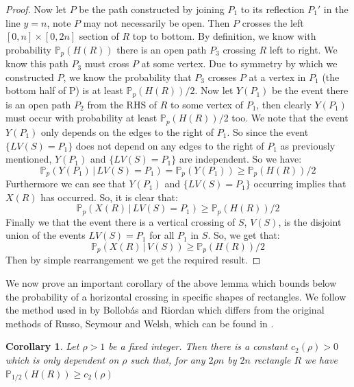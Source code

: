 \documentclass[a4paper,11pt]{article}
\newtheorem{corollary}[theorem]{Corollary}
\theoremstyle{definition}
\newcommand{\prob}{\mathbb{P}_p}
\begin{document}
\begin{proof}
	Now let $P$ be the path constructed by joining $P_1$ to its reflection $P_1'$ in the line $y=n$, note $P$ may not necessarily be open. Then $P$ crosses the left $[0,n] \times [0,2n]$ section of $R$ top to bottom. By definition, we know with probability $\prob(H(R))$ there is an open path $P_3$ crossing $R$ left to right. We know this path $P_3$ must cross $P$ at some vertex. Due to symmetry by which we constructed $P$, we know the probability that $P_3$ crosses $P$ at a vertex in $P_1$ (the bottom half of P) is at least $\prob(H(R))/2$. Now let $Y(P_1)$ be the event there is an open path $P_2$ from the RHS of $R$ to some vertex of $P_1$, then clearly $Y(P_1)$ must occur with probability at least $\prob(H(R))/2$ too. We note that the event $Y(P_1)$ only depends on the edges to the right of $P_1$. So since the event $\{LV(S) = P_1\}$ does not depend on any edges to the right of $P_1$ as previously mentioned, $Y(P_1)$ and $\{LV(S) = P_1\}$ are independent. So we have:
	$$\prob(Y(P_1) \, | \, LV(S) = P_1) = \prob(Y(P_1)) \geq \prob(H(R))/2 $$
	Furthermore we can see that $Y(P_1)$ and $\{LV(S) = P_1\}$ occurring implies that $X(R)$ has occurred. So, it is clear that:
	$$\prob(X(R) \, | \, LV(S) = P_1) \geq \prob(H(R))/2 $$
	Finally we that the event there is a vertical crossing of $S$, $V(S)$, is the disjoint union of the events ${LV(S) = P_1}$ for all $P_1$ in $S$. So, we get that:
	$$\prob(X(R) \, | \, V(S)) \geq \prob(H(R))/2 $$
	Then by simple rearrangement we get the required result.

\end{proof}

We now prove an important corollary of the above lemma which bounds below the probability of a horizontal crossing in specific shapes of rectangles. We follow the method used in \cite{bollobas2006short} by Bollob\'as and Riordan which differs from the original methods of Russo, Seymour and Welsh, which can be found in \cite{grimmett1999percolation}.

\begin{corollary}
	Let $\rho >1$ be a fixed integer. Then there is a constant $c_2(\rho) > 0$ which is only dependent on $\rho$ such that, for any $2\rho n$ by $2n$ rectangle $R$ we have $\mathbb{P}_{1/2}(H(R)) \geq c_2(\rho)$
\end{corollary}
\end{document}
